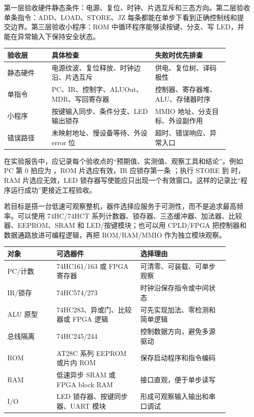 第一层验收硬件静态条件：电源、复位、时钟、片选互斥和三态方向。第二层验收单条指令：ADD、LOAD、STORE、JZ 每条都能在单步下看到正确控制线和提交边界。第三层验收小程序：ROM 中循环程序能够读按键、分支、写 LED，并能在异常输入下保持安全状态。

\begin{longtable}{L{0.18\linewidth}L{0.42\linewidth}L{0.3\linewidth}}
\toprule
验收层 & 具体检查 & 失败时优先排查 \\
\midrule
静态硬件 & 电源纹波、复位释放、时钟边沿、片选互斥 & 供电、复位树、译码极性 \\
单指令 & PC、IR、控制字、ALUOut、MDR、写回寄存器 & 控制器、寄存器堆、ALU、存储器时序 \\
小程序 & 按键输入同步、条件分支、LED 输出锁存 & MMIO 地址、分支目标、外设副作用 \\
错误路径 & 未映射地址、慢设备等待、外设 error 位 & 超时、错误响应、异常入口 \\
\bottomrule
\end{longtable}

在实验报告中，应记录每个验收点的“预期值、实测值、观察工具和结论”。例如 PC 第 0 拍应为 ，ROM 片选应有效，IR 应锁存第一条 ；执行 STORE 到  时，RAM 片选应无效，LED 锁存器写使能应只出现一个有效窗口。这样的记录比“程序运行成功”更接近工程验收。

若目标是搭一台低速可观察整机，器件选择应服务于可测性，而不是追求最高频率。可以使用 74HC/74HCT 系列计数器、锁存器、三态缓冲器、加法器、比较器、EEPROM、SRAM 和 LED/按键模块；也可以用 CPLD/FPGA 把控制器和数据通路放进可编程逻辑，再把 ROM/RAM/MMIO 作为独立模块观察。

\begin{longtable}{L{0.2\linewidth}L{0.34\linewidth}L{0.36\linewidth}}
\toprule
对象 & 可选器件 & 选择理由 \\
\midrule
PC/计数 & 74HC161/163 或 FPGA 寄存器 & 可清零、可装载、可单步观察 \\
IR/锁存 & 74HC574/273 & 时钟沿保存指令或中间状态 \\
ALU 原型 & 74HC283、异或门、比较器或 FPGA 逻辑 & 可先实现加法、零检测和简单逻辑 \\
总线隔离 & 74HC245/244 & 控制数据方向，避免多源驱动 \\
ROM & AT28C 系列 EEPROM 或片内 ROM & 保存启动程序和指令编码 \\
RAM & 低速异步 SRAM 或 FPGA block RAM & 接口直观，便于单步读写 \\
I/O & LED 锁存器、按键同步器、UART 模块 & 形成可观察输入输出和串口调试 \\
\bottomrule
\end{longtable}

